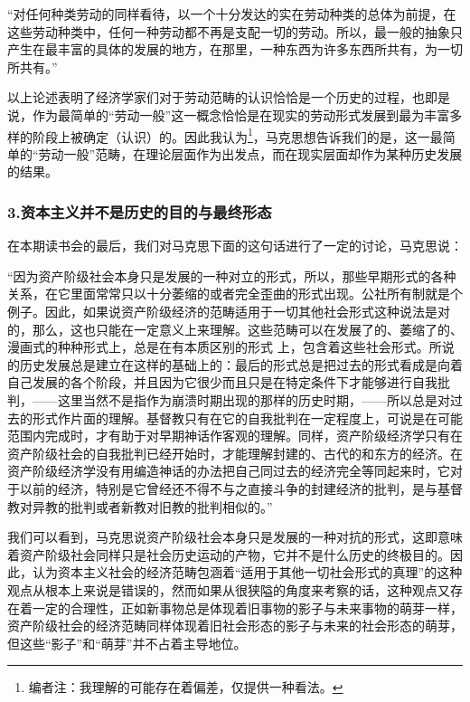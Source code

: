 \documentclass[a4paper,twoside,12pt,AutoFakeBold]{ctexart}
\begin{document}
\begin{adjustwidth}{2em}{2em}
    \qquad\fangsong
    “对任何种类劳动的同样看待，以一个十分发达的实在劳动种类的总体为前提，在这些劳动种类中，任何一种劳动都不再是支配一切的劳动。所以，最一般的抽象只产生在最丰富的具体的发展的地方，在那里，一种东西为许多东西所共有，为一切所共有。”
\end{adjustwidth}

以上论述表明了经济学家们对于劳动范畴的认识恰恰是一个历史的过程，也即是说，作为最简单的“劳动一般”这一概念恰恰是在现实的劳动形式发展到最为丰富多样的阶段上被确定（认识）的。因此我认为\footnote{编者注：我理解的可能存在着偏差，仅提供一种看法。}，马克思想告诉我们的是，这一最简单的“劳动一般”范畴，在理论层面作为出发点，而在现实层面却作为某种历史发展的结果。

\subsubsection{3.资本主义并不是历史的目的与最终形态}
在本期读书会的最后，我们对马克思下面的这句话进行了一定的讨论，马克思说：

\begin{adjustwidth}{2em}{2em}
    \qquad\fangsong
“因为资产阶级社会本身只是发展的一种对立的形式，所以，那些早期形式的各种关系，在它里面常常只以十分萎缩的或者完全歪曲的形式出现。公社所有制就是个例子。因此，如果说资产阶级经济的范畴适用于一切其他社会形式这种说法是对的，那么，这也只能在一定意义上来理解。这些范畴可以在发展了的、萎缩了的、漫画式的种种形式上，总是在有本质区别的形式 上，包含着这些社会形式。所说的历史发展总是建立在这样的基础上的：最后的形式总是把过去的形式看成是向着自己发展的各个阶段，并且因为它很少而且只是在特定条件下才能够进行自我批判，——这里当然不是指作为崩溃时期出现的那样的历史时期，——所以总是对过去的形式作片面的理解。基督教只有在它的自我批判在一定程度上，可说是在可能范围内完成时，才有助于对早期神话作客观的理解。同样，资产阶级经济学只有在资产阶级社会的自我批判已经开始时，才能理解封建的、古代的和东方的经济。在资产阶级经济学没有用编造神话的办法把自己同过去的经济完全等同起来时，它对于以前的经济，特别是它曾经还不得不与之直接斗争的封建经济的批判，是与基督教对异教的批判或者新教对旧教的批判相似的。”
\end{adjustwidth}

我们可以看到，马克思说资产阶级社会本身只是发展的一种对抗的形式，这即意味着资产阶级社会同样只是社会历史运动的产物，它并不是什么历史的终极目的。因此，认为资本主义社会的经济范畴包涵着“适用于其他一切社会形式的真理”的这种观点从根本上来说是错误的，然而如果从很狭隘的角度来考察的话，这种观点又存在着一定的合理性，正如新事物总是体现着旧事物的影子与未来事物的萌芽一样，资产阶级社会的经济范畴同样体现着旧社会形态的影子与未来的社会形态的萌芽，但这些“影子”和“萌芽”并不占着主导地位。
\end{document}
